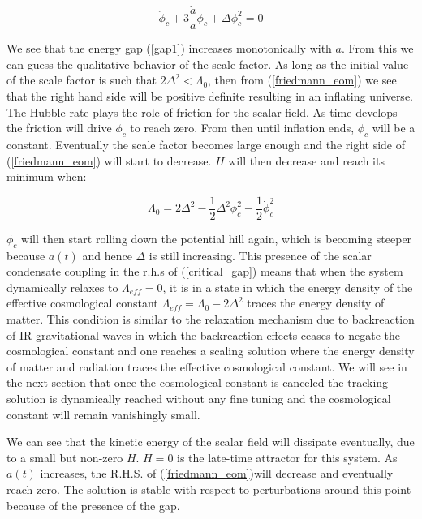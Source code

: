 \begin{doublespace}
\begin{equation}\label{scalar_eom}
    \ddot \phi_c + 3\frac{\dot a}{a}\dot \phi_c + \Delta \phi_c^2 = 0
\end{equation}

We see that the energy gap (\ref{gap1}) increases monotonically with
$a$. From this we can guess the qualitative behavior of the scale
factor.  As long as the initial value of the scale factor is such
that $2 \Delta^2 < \Lambda_0$, then from (\ref{friedmann_eom}) we
see that the right hand side will be positive definite resulting in
an inflating universe. The Hubble rate plays the role of friction
for the scalar field. As time develops the friction will drive $\dot
\phi_c$ to reach zero.  From then until inflation ends, $\phi_c$
will be a constant. Eventually the scale factor becomes large enough
and the right side of (\ref{friedmann_eom}) will start to decrease.
$H$ will then decrease and reach its minimum when:

\begin{equation}\label{critical_gap}
 \Lambda_0 = 2 \Delta^2  -  \frac{1}{2}\Delta^{2}\phi_{c}^{2} -
 \frac{1}{2}\dot \phi_c^2
\end{equation}

$\phi_c$ will then start rolling down the potential hill again,
which is becoming steeper because $a(t)$ and hence $\Delta$ is still
increasing. This presence of the scalar condensate coupling in the
r.h.s of (\ref{critical_gap}) means that when the system dynamically
relaxes to $\Lambda_{eff} = 0$,   it is in a state in which the
energy density of the effective cosmological constant
$\Lambda_{eff}=\Lambda_{0}-2 \Delta^2 $ traces the energy density of
matter.   This condition is similar to the relaxation mechanism due
to backreaction of IR gravitational waves in which the backreaction
effects ceases to negate the cosmological constant and one reaches a
scaling solution where the energy density of matter and radiation
traces the effective cosmological constant\cite{Brandenberger2002BackReaction,
Abramo1999Cosmological}. We will see in the next section that once the
cosmological constant is canceled the tracking solution is
dynamically reached without any fine tuning and the cosmological
constant will remain vanishingly small.

We can see that the kinetic energy of the scalar field will
dissipate eventually, due to a small but non-zero $H$. $H = 0$ is
the late-time attractor for this system. As $a(t)$ increases, the
R.H.S. of (\ref{friedmann_eom})will decrease and eventually reach
zero. The solution is stable with respect to perturbations around
this point because of the presence of the gap.


\end{doublespace}
